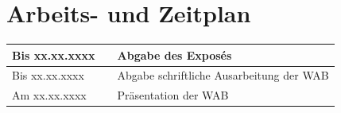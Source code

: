 \section{Arbeits- und Zeitplan}										%

\begin{tabular}{l c l} %
    
    Bis xx.xx.xxxx & \hspace{4cm} & Abgabe des Exposés \\ \hline 
    Bis xx.xx.xxxx & 	\hspace{4cm} &  Abgabe schriftliche Ausarbeitung der WAB\\ \hline
    Am xx.xx.xxxx & 	\hspace{4cm}	& Präsentation der WAB 
    
\end{tabular}
